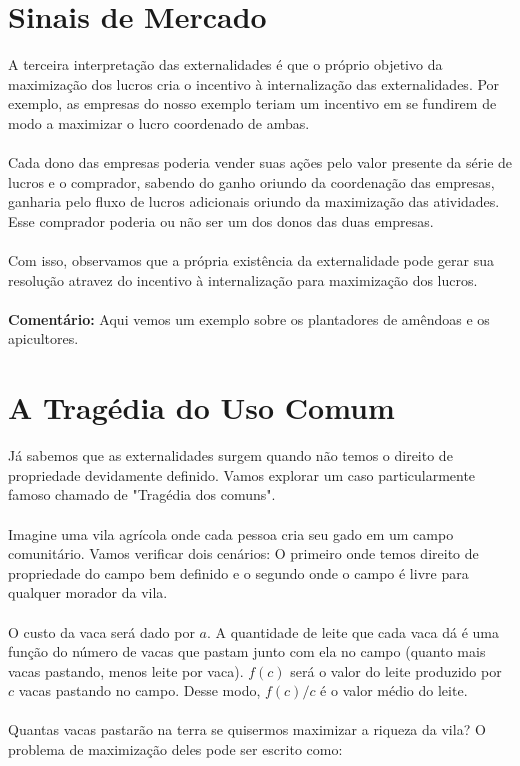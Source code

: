 \documentclass[a4paper,11pt,oneside]{book}
\theoremstyle{definition}
\theoremstyle{break}
\begin{document}
\section{Sinais de Mercado}

A terceira interpretação das externalidades é que o próprio objetivo da maximização dos lucros cria o incentivo à internalização das externalidades. Por exemplo, as empresas do nosso exemplo teriam um incentivo em se fundirem de modo a maximizar o lucro coordenado de ambas.
\\~\\
Cada dono das empresas poderia vender suas ações pelo valor presente da série de lucros e o comprador, sabendo do ganho oriundo da coordenação das empresas, ganharia pelo fluxo de lucros adicionais oriundo da maximização das atividades. Esse comprador poderia ou não ser um dos donos das duas empresas.
\\~\\
Com isso, observamos que a própria existência da externalidade pode gerar sua resolução atravez do incentivo à internalização para maximização dos lucros.
\\~\\
\textbf{Comentário:} Aqui vemos um exemplo sobre os plantadores de amêndoas e os apicultores. 

\section{A Tragédia do Uso Comum}

Já sabemos que as externalidades surgem quando não temos o direito de propriedade devidamente definido. Vamos explorar um caso particularmente famoso chamado de "Tragédia dos comuns".
\\~\\
Imagine uma vila agrícola onde cada pessoa cria seu gado em um campo comunitário. Vamos verificar dois cenários: O primeiro onde temos direito de propriedade do campo bem definido e o segundo onde o campo é livre para qualquer morador da vila.
\\~\\
O custo da vaca será dado por $a$. A quantidade de leite que cada vaca dá é uma função do número de vacas que pastam junto com ela no campo (quanto mais vacas pastando, menos leite por vaca). $f(c)$ será o valor do leite produzido por $c$ vacas pastando no campo. Desse modo, $f(c)/c$ é o valor médio do leite.
\\~\\
Quantas vacas pastarão na terra se quisermos maximizar a riqueza da vila? O problema de maximização deles pode ser escrito como:
\end{document}
